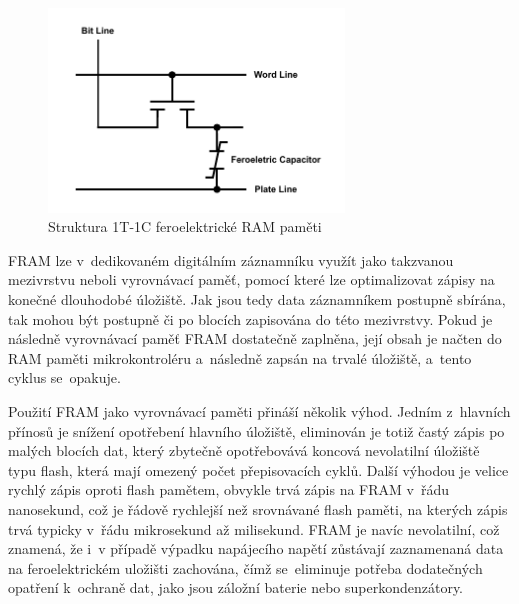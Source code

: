 \begin{figure}[h]
    \centering
    \includegraphics[width=0.70\textwidth]{obrazky-figures/fram_t1-c1.pdf}
    
    \caption{Struktura 1T-1C feroelektrické RAM paměti~\cite{researchgate_nonvolatile_memory_technologies}}
    \label{fig:feram-1t-1c}
\end{figure}

FRAM lze v~dedikovaném digitálním záznamníku využít jako takzvanou mezivrstvu neboli vyrovnávací paměť, pomocí které lze optimalizovat zápisy na konečné dlouhodobé úložiště. Jak jsou tedy data záznamníkem postupně sbírána, tak mohou být postupně či po blocích zapisována do této mezivrstvy. Pokud je následně vyrovnávací paměť FRAM dostatečně zaplněna, její obsah je načten do RAM paměti mikrokontroléru a~následně zapsán na trvalé úložiště, a~tento cyklus se~opakuje.

Použití FRAM jako vyrovnávací paměti přináší několik výhod. Jedním z~hlavních přínosů je snížení opotřebení hlavního úložiště, eliminován je totiž častý zápis po malých blocích dat, který zbytečně opotřebovává koncová nevolatilní úložiště typu flash, která mají omezený počet přepisovacích cyklů. Další výhodou je velice rychlý zápis oproti flash pamětem, obvykle trvá zápis na FRAM v~řádu nanosekund, což je řádově rychlejší než srovnávané flash paměti, na kterých zápis trvá typicky v~řádu mikrosekund až milisekund. FRAM je navíc nevolatilní, což znamená, že i~v případě výpadku napájecího napětí zůstávají zaznamenaná data na feroelektrickém uložišti zachována, čímž se~eliminuje potřeba dodatečných opatření k~ochraně dat, jako jsou záložní baterie nebo superkondenzátory.

